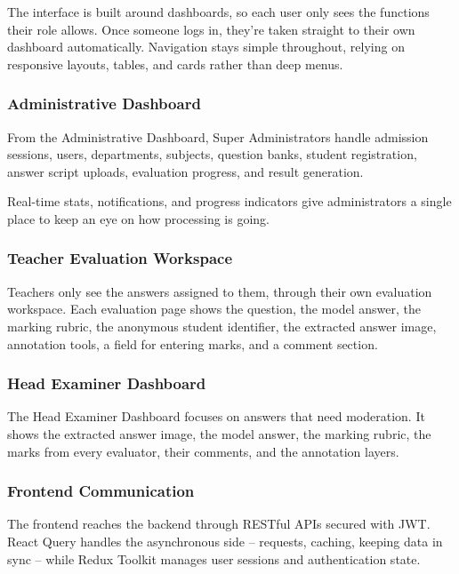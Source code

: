 The interface is built around dashboards, so each user only sees the functions their role allows. Once someone logs in, they're taken straight to their own dashboard automatically. Navigation stays simple throughout, relying on responsive layouts, tables, and cards rather than deep menus.

\subsubsection{Administrative Dashboard}

From the Administrative Dashboard, Super Administrators handle admission sessions, users, departments, subjects, question banks, student registration, answer script uploads, evaluation progress, and result generation.

Real-time stats, notifications, and progress indicators give administrators a single place to keep an eye on how processing is going.

\subsubsection{Teacher Evaluation Workspace}

Teachers only see the answers assigned to them, through their own evaluation workspace. Each evaluation page shows the question, the model answer, the marking rubric, the anonymous student identifier, the extracted answer image, annotation tools, a field for entering marks, and a comment section.

\subsubsection{Head Examiner Dashboard}

The Head Examiner Dashboard focuses on answers that need moderation. It shows the extracted answer image, the model answer, the marking rubric, the marks from every evaluator, their comments, and the annotation layers.

\subsubsection{Frontend Communication}

The frontend reaches the backend through RESTful APIs secured with JWT. React Query handles the asynchronous side -- requests, caching, keeping data in sync -- while Redux Toolkit manages user sessions and authentication state.

